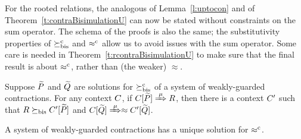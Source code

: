 For the rooted relations, the analogous of Lemma~\ref{l:uptocon} and of
Theorem~\ref{t:contraBisimulationU} can now be stated without constraints on the sum
operator.  
The schema of the proofs is also the same; the substitutivity
properties of 
$\mathrel{\succeq^{\rm{c}}_{\rm{bis}}}$ and $\mathrel{\approx^{\rm{c}}}$ allow us to avoid issues with the sum
operator. Some care is needed in Theorem~\ref{t:rcontraBisimulationU}
to make sure that the final result is about  
$\mathrel{\approx^{\rm{c}}}$, rather than (the weaker) $\approx$.

\begin{lemma}
\label{l:ruptocon}
Suppose $\widetilde P$ and $\widetilde Q$ are solutions  for $\mathrel{\succeq^{\rm{c}}_{\rm{bis}}}$ 
 of a system of weakly-guarded
contractions.
For any context $C$, 
if  $\ct{\til P}\Arr{\mu}  R$,
 then 
there is a  context $C'$
such that $R \mathrel{\succeq_{\rm{bis}}} C' [\widetilde P]$ and  $\ct{\til Q} \Arr{\mu}
 \wb \ctp{\til Q}$.
\end{lemma}

\begin{theorem}
\label{t:rcontraBisimulationU}
A system of weakly-guarded contractions has a unique solution 
 for $\mathrel{\approx^{\rm{c}}}$.
\end{theorem} 

